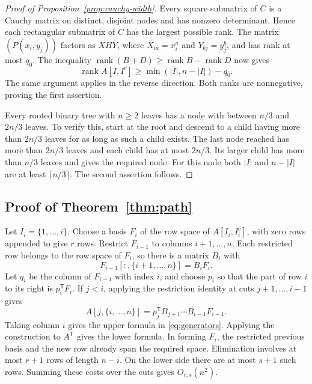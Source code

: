 \documentclass[11pt,reqno]{amsart}
\theoremstyle{remark}
\numberwithin{equation}{section}
\newcommand{\rk}{\operatorname{rank}}
\begin{document}
\begin{proof}[Proof of Proposition~\ref{prop:cauchy-width}]
Every square submatrix of $C$ is a Cauchy matrix on distinct,
disjoint nodes and has nonzero determinant. Hence each rectangular
submatrix of $C$ has the largest possible rank. The matrix
$(P(x_i,y_j))$ factors as $XHY$, where $X_{ia}=x_i^a$ and
$Y_{bj}=y_j^b$, and has rank at most $q_0$.
The inequality $\rk(B+D)\geq\rk B-\rk D$ now gives
\[
 \rk A[I,I^c]\geq\min(|I|,n-|I|)-q_0.
\]
The same argument applies in the reverse direction. Both ranks
are nonnegative, proving the first assertion.

Every rooted binary tree with $n\geq2$ leaves has a node with
between $n/3$ and $2n/3$ leaves. To verify this, start at the root
and descend to a child having more than $2n/3$ leaves for as long
as such a child exists. The last node reached has more than
$2n/3$ leaves and each child has at most $2n/3$. Its larger
child has more than $n/3$ leaves and gives the required node.
For this node both $|I|$ and $n-|I|$ are at least
$\lceil n/3\rceil$. The second assertion follows.
\end{proof}


\subsection{Proof of Theorem~\ref{thm:path}}

Let \(I_i=\{1,\ldots,i\}\). Choose a basis \(F_i\) of the row space of
\(A[I_i,I_i^c]\), with zero rows appended to give \(r\) rows. Restrict
\(F_{i-1}\) to columns \(i+1,\ldots,n\). Each restricted row belongs to
the row space of \(F_i\), so there is a matrix \(B_i\) with
\[
 F_{i-1}[:,\{i+1,\ldots,n\}]=B_iF_i.
\]
Let \(q_i\) be the column of \(F_{i-1}\) with index \(i\), and choose
\(p_i\) so that the part of row \(i\) to its right is \(p_i^{\mathsf
T}F_i\). If \(j<i\), applying the restriction identity at cuts
\(j+1,\ldots,i-1\) gives
\[
 A[j,\{i,\ldots,n\}]
   =p_j^{\mathsf T}B_{j+1}\cdots B_{i-1}F_{i-1}.
\]
Taking column \(i\) gives the upper formula in \eqref{eq:generators}.
Applying the construction to \(A^{\mathsf T}\) gives the lower formula.
In forming \(F_i\), the restricted previous basis and the new row already
span the required space. Elimination involves at most \(r+1\) rows of
length \(n-i\). On the lower side there are at most \(s+1\) such rows.
Summing these costs over the cuts gives \(O_{r,s}(n^2)\).
\end{document}
